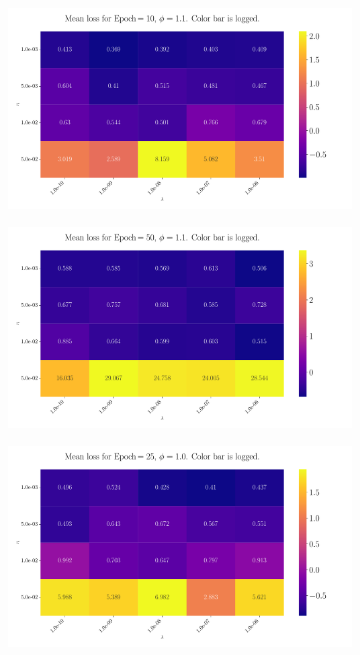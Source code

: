 \documentclass[%
reprint,
amsmath,amssymb,
aps,
]{revtex4-2}
\begin{document}
\begin{figure}[H]
	\begin{subfigure}{0.499\textwidth}
		\includegraphics[width=\textwidth]{Figures/CNN_2D_Plot_Loss_Epoch10_Boost1.1.pdf}
	\end{subfigure}
	\newline
	\begin{subfigure}{0.499\textwidth}
		\includegraphics[width=\textwidth]{Figures/CNN_2D_Plot_Loss_Epoch50_Boost1.1.pdf}
	\end{subfigure}
	\caption{Average test loss for the $5$-fold cross validation using \texttt{tensorflow.keras}' \texttt{CNN} with 10 and 50 epochs respectively, and $\phi=1.1$ for both. Note that we have taken the logarithm of the colorbar to get more sensitivity at lower loss.}
	\label{fig:CNN_2D_Epochs}
	\begin{subfigure}{0.499\textwidth}
		\includegraphics[width=\textwidth]{Figures/CNN_2D_Plot_Loss_Epoch25_Boost1.0.pdf}

\end{subfigure}
\end{figure}
\end{document}

